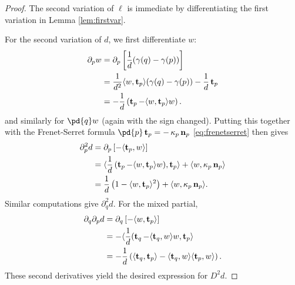 \documentclass[11pt]{amsart}
\begin{document}
\begin{proof}
The second variation of \(\ell\) is immediate by differentiating the first variation in Lemma \ref{lem:firstvar}.

For the second variation of \(d\), we first differentiate $w$:
\[
\begin{split}
\partial_p w &= \partial_p \left[\frac{1}{d} (\gamma(q) - \gamma(p))\right] \\
&= \frac{1}{d^2} \langle{w},{\operatorname{\mathbf{t}}_p}\rangle (\gamma(q) - \gamma(p)) - \frac{1}{d} \operatorname{\mathbf{t}}_p \\
&= -\frac{1}{d}\left(\operatorname{\mathbf{t}}_p - \langle{w},{\operatorname{\mathbf{t}}_p}\rangle w\right).
\end{split}
\]
and similarly for $\pd{q} w$ (again with the sign changed).  Putting this together with the Frenet-Serret formula $\pd{p} \tang_p = -\curvecurv_p \nor_p$ \eqref{eq:frenetserret} then gives
\[
\begin{split}
\partial_p^2 d &= \partial_p \left[-\langle{\operatorname{\mathbf{t}}_p},{w}\rangle\right] \\
&= \langle{\frac{1}{d}\left(\operatorname{\mathbf{t}}_p - \ensuremath{\langle{w},{\operatorname{\mathbf{t}}_p}\rangle} w\right)},{\operatorname{\mathbf{t}}_p}\rangle + \langle{w},{\operatorname{\kappa}_p \operatorname{\mathbf{n}}_p}\rangle \\
&= \frac{1}{d}\left(1 - \langle{w},{\operatorname{\mathbf{t}}_p}\rangle^2\right) + \langle{w},{\operatorname{\kappa}_p \operatorname{\mathbf{n}}_p}\rangle.
\end{split}
\]
Similar computations give $\partial_q^2 d$. For the mixed partial,
\[
\begin{split}
\partial_q \partial_p d &= \partial_q \left[-\langle{w},{\operatorname{\mathbf{t}}_p}\rangle\right] \\
&= -\langle{\frac{1}{d}(\operatorname{\mathbf{t}}_q - \ensuremath{\langle{\operatorname{\mathbf{t}}_q},{w}\rangle}w},{\operatorname{\mathbf{t}}_p}\rangle \\
&= - \frac{1}{d} \left(\langle{\operatorname{\mathbf{t}}_q},{\operatorname{\mathbf{t}}_p}\rangle - \langle{\operatorname{\mathbf{t}}_q},{w}\rangle\langle{\operatorname{\mathbf{t}}_p},{w}\rangle\right).
\end{split}
\]
These second derivatives yield the desired expression for \(D^2 d\).
\end{proof}
\end{document}
